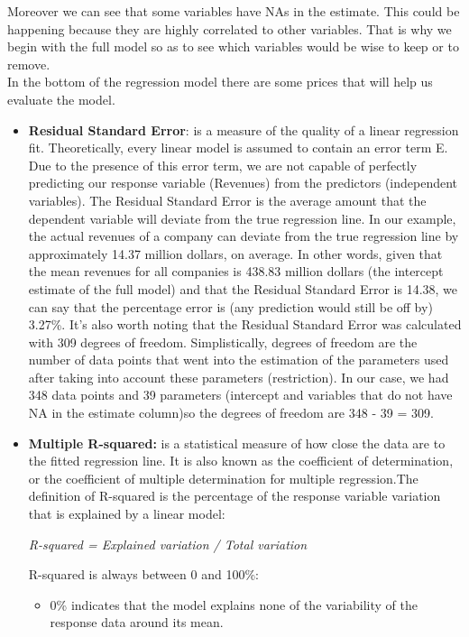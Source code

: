 \documentclass{article}
\begin{document}
Moreover we can see that some variables have NAs in the estimate. This could be happening because they are highly correlated to other variables. That is why we begin with the full model so as to see which variables would be wise to keep or to remove.\\
In the bottom of the regression model there are some prices that will help us evaluate the model.
\begin{itemize}
\item \textbf{Residual Standard Error}: is a measure of the quality of a linear regression fit. Theoretically, every linear model is assumed to contain an error term E. Due to the presence of this error term, we are not capable of perfectly predicting our response variable (Revenues) from the predictors (independent variables). The Residual Standard Error is the average amount that the dependent variable will deviate from the true regression line. In our example, the actual revenues of a company can deviate from the true regression line by approximately 14.37 million dollars, on average. In other words, given that the mean revenues for all companies is 438.83 million dollars (the intercept estimate of the full model) and that the Residual Standard Error is 14.38, we can say that the percentage error is (any prediction would still be off by) 3.27\%. It’s also worth noting that the Residual Standard Error was calculated with 309 degrees of freedom. Simplistically, degrees of freedom are the number of data points that went into the estimation of the parameters used after taking into account these parameters (restriction). In our case, we had 348 data points and 39 parameters (intercept and variables that do not have NA in the estimate column)so the degrees of freedom are 348 - 39 = 309.
\item \textbf{Multiple R-squared:} is a statistical measure of how close the data are to the fitted regression line. It is also known as the coefficient of determination, or the coefficient of multiple determination for multiple regression.The definition of R-squared is the percentage of the response variable variation that is explained by a linear model:
\begin{center}
\textit{R-squared = Explained variation / Total variation}
\end{center}
R-squared is always between 0 and 100\%:
\begin{itemize}
\item 0\% indicates that the model explains none of the variability of the response data around its mean.

\end{itemize}
\end{itemize}
\end{document}
